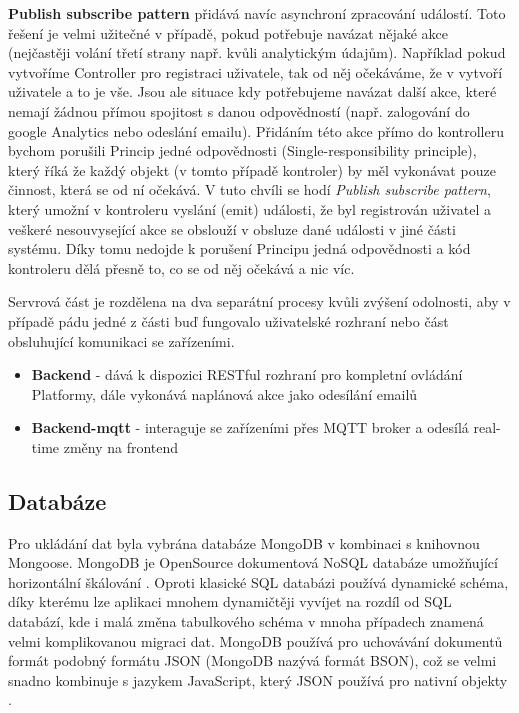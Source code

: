 \textbf{Publish subscribe pattern} přidává navíc asynchroní zpracování událostí. Toto řešení je velmi užitečné v případě, pokud potřebuje navázat nějaké akce (nejčastěji volání třetí strany např. kvůli analytickým údajům). Například pokud vytvoříme Controller pro registraci uživatele, tak od něj očekáváme, že v vytvoří uživatele a to je vše. Jsou ale situace kdy potřebujeme navázat další akce, které nemají žádnou přímou spojitost s danou odpovědností (např. zalogování do google Analytics nebo odeslání emailu). Přidáním této akce přímo do kontrolleru bychom porušili Princip jedné odpovědnosti (Single-responsibility principle), který říká že každý objekt (v tomto případě kontroler) by měl vykonávat pouze činnost, která se od ní očekává. V tuto chvíli se hodí  \textit{Publish subscribe pattern}, který umožní v kontroleru vyslání (emit) události, že byl registrován uživatel a veškeré nesouvysející akce se obslouží v obsluze dané události v jiné části systému. Díky tomu nedojde k porušení Principu jedná odpovědnosti a kód kontroleru dělá přesně to, co se od něj očekává a nic víc.

Servrová část je rozdělena na dva separátní procesy kvůli zvýšení odolnosti, aby v případě pádu jedné z části buď fungovalo uživatelské rozhraní nebo část obsluhující komunikaci se zařízeními.
\begin{itemize}
    \item \textbf{Backend} - dává k dispozici RESTful rozhraní pro kompletní ovládání Platformy, dále vykonává naplánová akce jako odesílání emailů
    \item \textbf{Backend-mqtt} - interaguje se zařízeními přes MQTT broker a odesílá real-time změny na frontend
\end{itemize}

\subsection{Databáze}
Pro ukládání dat byla vybrána databáze MongoDB v kombinaci s knihovnou Mongoose. MongoDB je OpenSource dokumentová NoSQL databáze umožňující horizontální škálování \cite{mongodb}. Oproti klasické SQL databázi používá dynamické schéma, díky kterému lze aplikaci mnohem dynamičtěji vyvíjet na rozdíl od SQL databází, kde i malá změna tabulkového schéma v mnoha případech znamená velmi komplikovanou migraci dat. MongoDB používá pro uchovávání dokumentů formát podobný formátu JSON (MongoDB nazývá formát BSON), což se velmi snadno kombinuje s jazykem JavaScript, který JSON používá pro nativní objekty \cite{bson-vs-json}.


